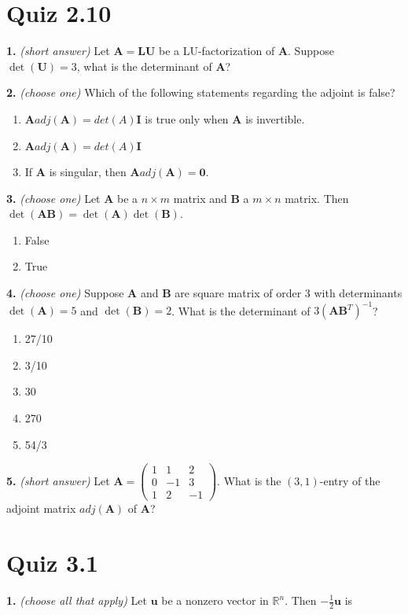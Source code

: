 \documentclass[10pt,a4paper]{article}
\begin{document}
\section{Quiz 2.10}
\textbf{1.} \textit{(short answer)} Let \(\mathbf{A=LU}\) be a LU-factorization of \(\mathbf{A}\). Suppose \(\det(\mathbf{U})=3\), what is the determinant of \(\mathbf{A}\)?

\smallskip
\textbf{2.} \textit{(choose one)} Which of the following statements regarding the adjoint is false?

\begin{enumerate}[label=(\Alph*)]
\item \(\mathbf{A}adj(\mathbf{A})=det(A)\mathbf{I}\) is true only when \(\mathbf{A}\) is invertible.
\item \(\mathbf{A}adj(\mathbf{A})=det(A)\mathbf{I}\)
\item If \(\mathbf{A}\) is singular, then \( \mathbf{A}adj( \mathbf{A})= \mathbf{0}\).
\end{enumerate}
\smallskip
\textbf{3.} \textit{(choose one)} Let \(\mathbf{A}\) be a \(n\times m\) matrix and \(\mathbf{B}\) a \(m\times n\) matrix. Then \(\det(\mathbf{AB})=\det(\mathbf{A})\det(\mathbf{B})\).

\begin{enumerate}[label=(\Alph*)]
\item False
\item True
\end{enumerate}
\smallskip
\textbf{4.} \textit{(choose one)} Suppose \(\mathbf{A}\) and \(\mathbf{B}\) are square matrix of order 3 with determinants \(\det(\mathbf{A})=5\) and \(\det(\mathbf{B})=2\). What is the determinant of \(3(\mathbf{AB}^T)^{-1}\)?

\begin{enumerate}[label=(\Alph*)]
\item 27/10
\item 3/10
\item 30
\item 270
\item 54/3
\end{enumerate}
\smallskip
\textbf{5.} \textit{(short answer)} Let \(\mathbf{A}=\begin{pmatrix}1&1&2\\0&-1&3\\1&2&-1\end{pmatrix}\). What is the \((3,1)\)-entry of the adjoint matrix \(adj(\mathbf{A})\) of \(\mathbf{A}\)?

\smallskip
\section{Quiz 3.1}
\textbf{1.} \textit{(choose all that apply)} Let \(\mathbf{u}\) be a nonzero vector in \(\mathbb R^n\). Then \(-\frac{1}{2}\mathbf{u}\) is
\end{document}

